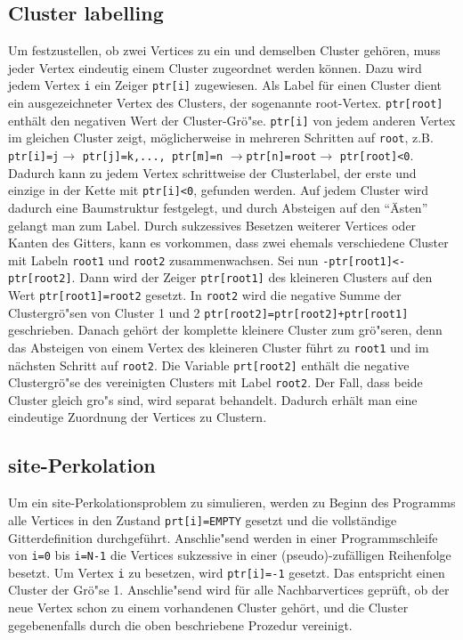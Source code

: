 \subsection{Cluster labelling}
Um festzustellen, ob zwei Vertices zu ein und demselben Cluster geh\"oren, muss jeder Vertex eindeutig einem Cluster zugeordnet werden k\"onnen. Dazu wird jedem Vertex \texttt{i} ein Zeiger \texttt{ptr[i]} zugewiesen. Als Label f\"ur einen Cluster dient ein ausgezeichneter Vertex des Clusters, der sogenannte root-Vertex. \texttt{ptr[root]} enth\"alt den negativen Wert der Cluster-Gr\"o"se. \texttt{ptr[i]} von jedem anderen Vertex im gleichen Cluster zeigt, m\"oglicherweise in mehreren Schritten auf \texttt{root}, z.B. \texttt{ptr[i]=j}$\rightarrow$ \texttt{ptr[j]=k,..., ptr[m]=n} $\rightarrow$\texttt{ptr[n]=root}$\rightarrow$ \texttt{ptr[root]<0}. Dadurch kann zu jedem Vertex schrittweise der Clusterlabel, der erste und einzige in der Kette mit \texttt{ptr[i]<0}, gefunden werden. Auf jedem Cluster wird dadurch eine Baumstruktur festgelegt, und durch Absteigen auf den ``\"Asten'' gelangt man zum Label. Durch sukzessives Besetzen weiterer Vertices oder Kanten des Gitters, kann es vorkommen, dass zwei ehemals verschiedene Cluster mit Labeln \texttt{root1} und \texttt{root2} zusammenwachsen. Sei nun \texttt{-ptr[root1]<-ptr[root2]}. Dann wird der Zeiger \texttt{ptr[root1]} des kleineren Clusters auf den Wert \texttt{ptr[root1]=root2} gesetzt. In \texttt{root2} wird die negative Summe der Clustergr\"o"sen von Cluster 1 und 2 \texttt{ptr[root2]=ptr[root2]+ptr[root1]} geschrieben. Danach geh\"ort der komplette kleinere Cluster zum gr\"o"seren, denn das Absteigen von einem Vertex des kleineren Cluster f\"uhrt zu \texttt{root1} und im n\"achsten Schritt auf \texttt{root2}. Die Variable \texttt{prt[root2]} enth\"alt die negative Clustergr\"o"se des vereinigten Clusters mit Label \texttt{root2}. Der Fall, dass beide Cluster gleich gro"s sind, wird separat behandelt. Dadurch erh\"alt man eine eindeutige Zuordnung der Vertices zu Clustern.   

\subsection{site-Perkolation}
Um ein site-Perkolationsproblem zu simulieren, werden zu Beginn des Programms alle Vertices in den Zustand \texttt{prt[i]=EMPTY} gesetzt und die vollst\"andige Gitterdefinition durchgef\"uhrt. Anschlie"send werden in einer Programmschleife von \texttt{i=0} bis \texttt{i=N-1} die Vertices sukzessive in einer (pseudo)-zuf\"alligen Reihenfolge besetzt. Um Vertex \texttt{i} zu besetzen, wird \texttt{ptr[i]=-1} gesetzt. Das entspricht einen Cluster der Gr\"o"se 1. Anschlie"send wird f\"ur alle Nachbarvertices gepr\"uft, ob der neue Vertex schon zu einem vorhandenen Cluster geh\"ort, und die Cluster gegebenenfalls durch die oben beschriebene Prozedur vereinigt.

